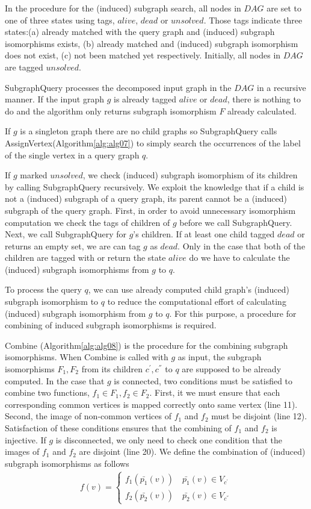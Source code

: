 In the procedure for the (induced) subgraph search, all nodes in $DAG$ are set to one of three states using tags, $alive$, $dead$ or $unsolved$.
Those tags indicate three states:(a) already matched  with the query graph and (induced) subgraph isomorphisms exists, (b) already matched and (induced) subgraph isomorphism does not exist, (c) not been matched yet respectively. Initially, all nodes in $DAG$ are tagged $unsolved$.

SubgraphQuery processes the decomposed input graph in the $DAG$ in a recursive manner.
If the input graph $g$ is already tagged $alive$ or $dead$, there is nothing to do and the algorithm only returns subgraph isomorphism $F$  already calculated.

If $g$ is a singleton graph there are no child graphs so SubgraphQuery calls AssignVertex(Algorithm\ref{alg:alg07}) to simply search the occurrences of the label of the single vertex in a query graph $q$.

If $g$ marked $unsolved$, we check (induced) subgraph isomorphism of its children by calling SubgraphQuery recursively.
We exploit the knowledge that if a child is not a (induced) subgraph of a query graph, its parent cannot be a (induced) subgraph of the query graph.
First, in order to avoid unnecessary isomorphism computation we check the tags of children of $g$ before we call SubgraphQuery. 
Next, we call SubgraphQuery for $g$'s children. If at least one child tagged $dead$ or returns an empty set, we are can tag $g$ as $dead$.  
Only in the case that both of the children are tagged with or return the state $alive$ do we have to calculate the (induced) subgraph isomorphisms from $g$ to $q$.

To process the query $q$, we can use already computed child graph's (induced) subgraph isomorphism to $q$ to reduce the computational effort of 
calculating (induced) subgraph isomorphism from $g$ to $q$. For this purpose, a procedure for combining of induced subgraph isomorphisms is required.

Combine (Algorithm\ref{alg:alg08}) is the procedure for the combining subgraph isomorphisms. When Combine is called with $g$ as input, the subgraph 
isomorphisms $F_1, F_2$ from its children $c^{'}, c^{''}$ to $q$ are supposed to be already computed.
In the case that $g$ is connected, two conditions must be satisfied to combine two functions, $f_1 \in F_1, f_2 \in F_2$.
First, it we must ensure that each corresponding common vertices is mapped correctly onto same vertex (line 11).
Second, the image of non-common vertices of $f_1$ and $f_2$ must be disjoint (line 12).
Satisfaction of these conditions ensures that the combining of $f_1$ and $f_2$ is injective.
If $g$ is disconnected, we only need to check one condition that the images of $f_1$ and $f_2$ are disjoint (line 20).
We define the combination of (induced) subgraph isomorphisms as follows
\begin{eqnarray}
\label{eq:eq1}
f(v) = \left\{
\begin{array}{l}
f_1(\bar{p_1}(v)) \quad \bar{p_1}(v) \in V_{c^{'}}\\
f_2(\bar{p_2}(v)) \quad \bar{p_2}(v) \in V_{c^{''}}
\end{array}
\right.
\end{eqnarray}
 
